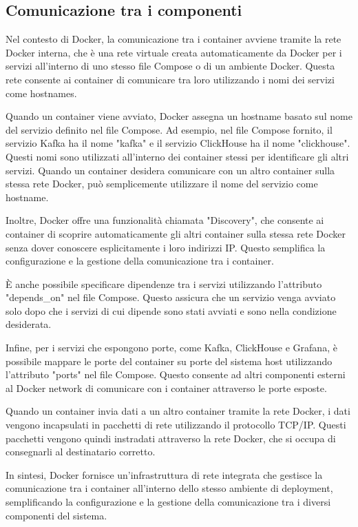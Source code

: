 \subsection{Comunicazione tra i componenti}
Nel contesto di Docker, la comunicazione tra i container avviene tramite la rete Docker interna, che è una rete virtuale creata automaticamente da Docker per i servizi all'interno di uno stesso file Compose o di un ambiente Docker. Questa rete consente ai container di comunicare tra loro utilizzando i nomi dei servizi come hostnames.

Quando un container viene avviato, Docker assegna un hostname basato sul nome del servizio definito nel file Compose. Ad esempio, nel file Compose fornito, il servizio Kafka ha il nome "kafka" e il servizio ClickHouse ha il nome "clickhouse". Questi nomi sono utilizzati all'interno dei container stessi per identificare gli altri servizi. Quando un container desidera comunicare con un altro container sulla stessa rete Docker, può semplicemente utilizzare il nome del servizio come hostname.

Inoltre, Docker offre una funzionalità chiamata "Discovery", che consente ai container di scoprire automaticamente gli altri container sulla stessa rete Docker senza dover conoscere esplicitamente i loro indirizzi IP. Questo semplifica la configurazione e la gestione della comunicazione tra i container.

È anche possibile specificare dipendenze tra i servizi utilizzando l'attributo "depends\_on" nel file Compose. Questo assicura che un servizio venga avviato solo dopo che i servizi di cui dipende sono stati avviati e sono nella condizione desiderata.

Infine, per i servizi che espongono porte, come Kafka, ClickHouse e Grafana, è possibile mappare le porte del container su porte del sistema host utilizzando l'attributo "ports" nel file Compose. Questo consente ad altri componenti esterni al Docker network di comunicare con i container attraverso le porte esposte.

Quando un container invia dati a un altro container tramite la rete Docker, i dati vengono incapsulati in pacchetti di rete utilizzando il protocollo TCP/IP. Questi pacchetti vengono quindi instradati attraverso la rete Docker, che si occupa di consegnarli al destinatario corretto.

In sintesi, Docker fornisce un'infrastruttura di rete integrata che gestisce la comunicazione tra i container all'interno dello stesso ambiente di deployment, semplificando la configurazione e la gestione della comunicazione tra i diversi componenti del sistema.


